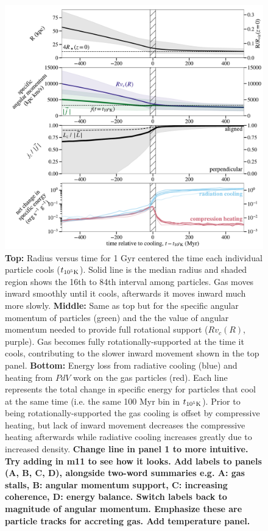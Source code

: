 \documentclass[fleqn,usenatbib]{mnras}
\begin{document}
\begin{figure}
\includegraphics[width=\textwidth]{figures/before_vs_after.pdf}
\caption{
\textbf{Top:}
Radius versus time for 1 Gyr centered the time each individual particle cools ($t_{\rm 10^5 K}$).
Solid line is the median radius and shaded region shows the 16th to 84th interval among particles.
Gas moves inward smoothly until it cools, afterwards it moves inward much more slowly.
\textbf{Middle:}
Same as top but for the specific angular momentum of particles (green) and the the value of angular momentum needed to provide full rotational support ($Rv_c(R)$, purple).
Gas becomes fully rotationally-supported at the time it cools, contributing to the slower inward movement shown in the top panel.
\textbf{Bottom:}
Energy loss from radiative cooling (blue) and heating from $PdV$ work on the gas particles (red).
Each line represents the total change in specific energy for particles that cool at the same time (i.e. the same 100 Myr bin in $t_{\rm 10^5 K}$).
Prior to being rotationally-supported the gas cooling is offset by compressive heating, but lack of inward movement decreases the compressive heating afterwards while radiative cooling increases greatly due to increased density.
\textbf{
Change line in panel 1 to more intuitive.
Try adding in m11 to see how it looks.
Add labels to panels (A, B, C, D), alongside two-word summaries e.g. A: gas stalls, B: angular momentum support, C: increasing coherence, D: energy balance.
Switch labels back to magnitude of angular momentum.
Emphasize these are particle tracks for accreting gas.
Add temperature panel.
}
}
\label{f: before and after}
\end{figure}
\end{document}
